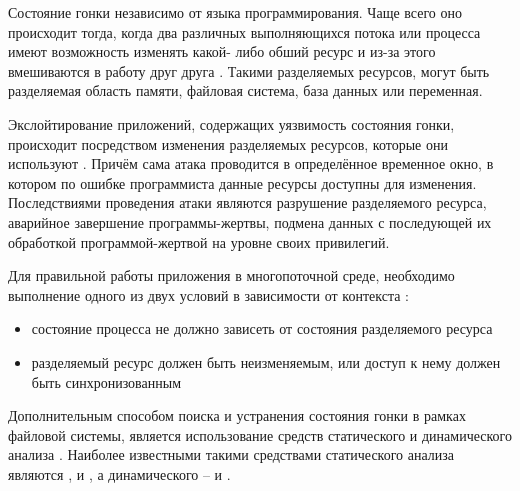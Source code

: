 %
Состояние гонки независимо от языка программирования. 
%
Чаще всего оно происходит тогда, когда два различных выполняющихся потока или процесса имеют 
возможность изменять какой- либо обший ресурс и из-за этого вмешиваются в работу друг друга 
. 
%
Такими разделяемых ресурсов, могут  быть разделяемая область памяти, файловая система, база данных 
или переменная. 

%
Экслойтирование приложений, содержащих уязвимость состояния гонки, происходит посредством изменения 
разделяемых ресурсов, которые они используют . 
%
Причём сама атака проводится в определённое временное окно, в котором по ошибке программиста данные 
ресурсы доступны для изменения. 
%
Последствиями проведения атаки являются разрушение разделяемого ресурса, аварийное завершение 
программы-жертвы, подмена данных с последующей их обработкой программой-жертвой на уровне своих 
привилегий. 

%
Для правильной работы приложения в многопоточной среде, необходимо выполнение одного из двух 
условий в зависимости от контекста  : 
\begin{itemize}
	\item состояние процесса не должно зависеть от состояния разделяемого ресурса
	\item разделяемый ресурс должен быть неизменяемым, или доступ к нему должен быть 
		синхронизованным 
\end{itemize}

%
Дополнительным способом поиска и устранения состояния гонки в рамках файловой системы, является 
использование средств статического и динамического анализа . 
%
Наиболее известными такими средствами статического анализа являются  , 
  и  , а динамического – 
  и  . 